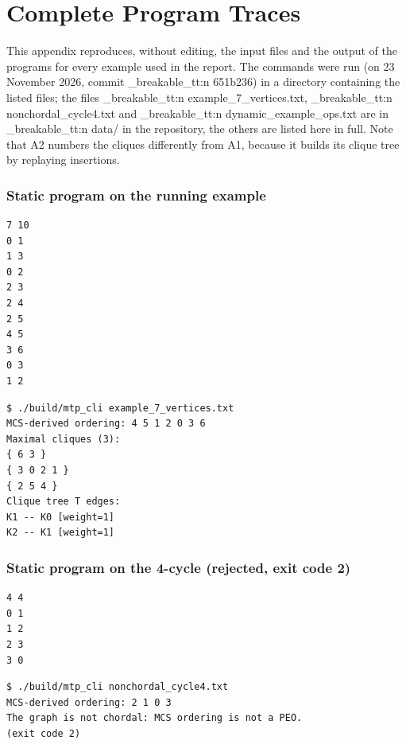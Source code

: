 \documentclass[11pt,a4paper,oneside]{report}
\theoremstyle{plain}
\theoremstyle{definition}
\theoremstyle{remark}
\DeclareRobustCommand{\code}[1]{\mtp_breakable_tt:n {#1}}
\DeclareRobustCommand{\file}[1]{\mtp_breakable_tt:n {#1}}
\begin{document}
\chapter{Complete Program Traces}\label{app:traces}
This appendix reproduces, without editing, the input files and the output of the programs for
every example used in the report. The commands were run (on 23 November 2026, commit
\code{651b236}) in a directory containing the listed files; the files
\file{example_7_vertices.txt}, \file{nonchordal_cycle4.txt} and \file{dynamic_example_ops.txt}
are in \file{data/} in the repository, the others are listed here in full. Note that A2 numbers
the cliques differently from A1, because it builds its clique tree by replaying insertions.

\subsection*{Static program on the running example}
\begin{lstlisting}[style=shell,title={\small\texttt{example\_7\_vertices.txt}}]
7 10
0 1
1 3
0 2
2 3
2 4
2 5
4 5
3 6
0 3
1 2
\end{lstlisting}
\begin{lstlisting}[style=shell]
$ ./build/mtp_cli example_7_vertices.txt
MCS-derived ordering: 4 5 1 2 0 3 6
Maximal cliques (3):
{ 6 3 }
{ 3 0 2 1 }
{ 2 5 4 }
Clique tree T edges:
K1 -- K0 [weight=1]
K2 -- K1 [weight=1]
\end{lstlisting}
\subsection*{Static program on the 4-cycle (rejected, exit code 2)}
\begin{lstlisting}[style=shell,title={\small\texttt{nonchordal\_cycle4.txt}}]
4 4
0 1
1 2
2 3
3 0
\end{lstlisting}
\begin{lstlisting}[style=shell]
$ ./build/mtp_cli nonchordal_cycle4.txt
MCS-derived ordering: 2 1 0 3
The graph is not chordal: MCS ordering is not a PEO.
(exit code 2)
\end{lstlisting}
\end{document}
